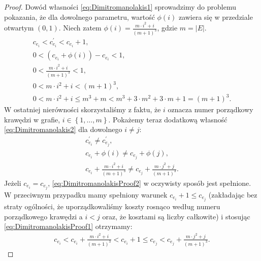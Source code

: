 {\begin{proof}
	Dowód własności \ref{eq:Dimitromanolakis1} sprowadzimy do problemu pokazania, że dla dowolnego parametru, wartość $\phi \left( i \right)$ zawiera się w przedziale otwartym $\left( 0, 1 \right)$. Niech zatem $\phi \left( i \right) = \frac{m \cdot i^{2} + i}{\left( m + 1 \right)^{3}}$, gdzie $m = \left| E \right|$.
	\begin{gather}
		c_{e_{i}} < c^{\prime}_{e_{i}} < c_{e_{i}} + 1\text{,}\nonumber\\
		0 < \left( c_{e_{i}} + \phi \left( i \right) \right) - c_{e_{i}} < 1\text{,}\nonumber\\
		0 < \frac{m \cdot i^{2} + i}{\left( m + 1 \right)^{3}} < 1\text{,}\label{eq:DimitromanolakisProof1}\\
		0 < m \cdot i^{2} + i < \left( m + 1 \right)^{3}\text{,}\nonumber\\
		0 < m \cdot i^{2} + i \leqslant m^{3} + m < m^{3} + 3 \cdot m^2 + 3 \cdot m + 1 = \left( m + 1 \right)^{3}\nonumber\text{.}
	\end{gather}
	W ostatniej nierówności skorzystaliśmy z faktu, że $i$ oznacza numer porządkowy krawędzi w grafie, $i \in \left\{ 1, \dots, m \right\}$. Pokażemy teraz dodatkową własność \ref{eq:Dimitromanolakis2} dla dowolnego $i \neq j$:
	\begin{gather}
		c^{\prime}_{e_{i}} \neq c^{\prime}_{e_{j}}\text{,}\nonumber\\
		c_{e_{i}} + \phi \left( i \right) \neq c_{e_{j}} + \phi \left( j \right)\text{,}\nonumber\\
		c_{e_{i}} + \frac{m \cdot i^{2} + i}{\left( m + 1 \right)^{3}} \neq c_{e_{j}} + \frac{m \cdot j^{2} + j}{\left( m + 1 \right)^{3}}\text{.}\label{eq:DimitromanolakisProof2}
	\end{gather}
	Jeżeli $c_{e_{i}} = c_{e_{j}}$, \ref{eq:DimitromanolakisProof2} w oczywisty sposób jest spełnione. W przeciwnym przypadku mamy spełniony warunek $c_{e_{i}} + 1 \leqslant c_{e_{j}}$ (zakładając bez straty ogólności, że uporządkowaliśmy koszty rosnąco według numeru porządkowego krawędzi a $i < j$ oraz, że kosztami są liczby całkowite) i stosując \ref{eq:DimitromanolakisProof1} otrzymamy:
	\begin{gather*}
		c_{e_{i}} < c_{e_{i}} + \frac{m \cdot i^{2} + i}{\left( m + 1 \right)^{3}} < c_{e_{i}} + 1 \leqslant c_{e_{j}} < c_{e_{j}} + \frac{m \cdot j^{2} + j}{\left( m + 1 \right)^{3}}\text{.}
	\end{gather*}
\end{proof}

}
